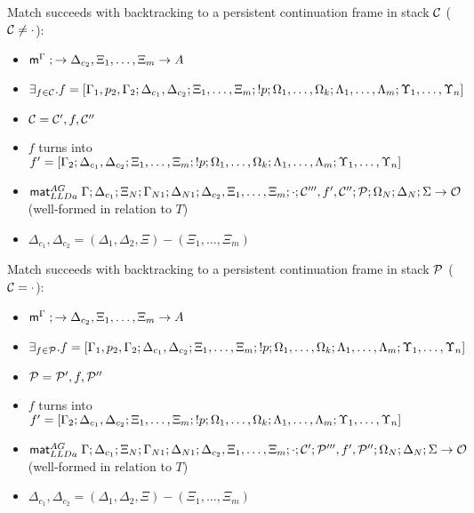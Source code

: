 \item Match succeeds with backtracking to a persistent continuation frame
in stack $\mathcal{C}$ ($\mathcal{C} \neq \cdot$):
\begin{itemize}[leftmargin=\secondm]
   \item $\mathsf{m}^{\Gamma} \; ; \rightarrow \Delta_{c_2}, \Xi_1, \dotsc, \Xi_m \rightarrow A$
   \item $\exists_{f \in \mathcal{C}}. f = [\Gamma_1, p_2, \Gamma_2; \Delta_{c_1},
      \Delta_{c_2}; \Xi_1, \dotsc, \Xi_m; {!} p; \Omega_1, \dotsc, \Omega_k;
      \Lambda_1, \dotsc, \Lambda_m; \Upsilon_1, \dotsc, \Upsilon_n]$
   \item $\mathcal{C} = \mathcal{C'}, f, \mathcal{C''}$
   \item $f$ turns into $f' = [\Gamma_2; \Delta_{c_1}, \Delta_{c_2};
      \Xi_1, \dotsc, \Xi_m; {!} p; \Omega_1, \dotsc, \Omega_k; \Lambda_1,
      \dotsc, \Lambda_m; \Upsilon_1, \dotsc, \Upsilon_n]$
   \item $\mathsf{mat}_{LLDa}^{AG} \; \Gamma; \Delta_{c_1}; \Xi_N; \Gamma_{N1}; \Delta_{N1};
      \Delta_{c_2}, \Xi_1, \dotsc, \Xi_m; \cdot; \mathcal{C'''}, f', \mathcal{C''}; \mathcal{P};
      \Omega_N; \Delta_N; \Sigma \rightarrow \mathcal{O}$ (well-formed in relation to $T$)
   \item $\Delta_{c_1}, \Delta_{c_2} = (\Delta_1, \Delta_2, \Xi) - (\Xi_1, \dotsc, \Xi_m)$
\end{itemize}

\item Match succeeds with backtracking to a persistent continuation frame
in stack $\mathcal{P}$ ($\mathcal{C} = \cdot$):
   \begin{itemize}[leftmargin=\secondm]
      \item $\mathsf{m}^{\Gamma} \; ; \rightarrow \Delta_{c_2}, \Xi_1, \dotsc, \Xi_m \rightarrow A$
      \item $\exists_{f \in \mathcal{P}}. f = [\Gamma_1, p_2, \Gamma_2; \Delta_{c_1}, \Delta_{c_2};
   \Xi_1, \dotsc, \Xi_m; {!} p; \Omega_1, \dotsc, \Omega_k; \Lambda_1,
   \dotsc, \Lambda_m; \Upsilon_1, \dotsc, \Upsilon_n]$
      \item $\mathcal{P} = \mathcal{P'}, f, \mathcal{P''}$
      \item $f$ turns into $f' = [\Gamma_2; \Delta_{c_1},
         \Delta_{c_2}; \Xi_1, \dotsc, \Xi_m; {!} p; \Omega_1, \dotsc,
         \Omega_k; \Lambda_1, \dotsc, \Lambda_m; \Upsilon_1, \dotsc, \Upsilon_n]$
      \item $\mathsf{mat}_{LLDa}^{AG} \; \Gamma; \Delta_{c_1}; \Xi_N; \Gamma_{N1}; \Delta_{N1};
         \Delta_{c_2}, \Xi_1, \dotsc, \Xi_m; \cdot; \mathcal{C'}; \mathcal{P'''}, f', \mathcal{P''};
         \Omega_N; \Delta_N; \Sigma \rightarrow \mathcal{O}$
         (well-formed in relation to $T$)
      \item $\Delta_{c_1}, \Delta_{c_2} = (\Delta_1, \Delta_2, \Xi) - (\Xi_1, \dotsc,
            \Xi_m)$
   \end{itemize}
